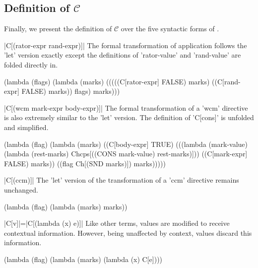 \subsection{Definition of $\mathcal{C}$}

Finally, we present the definition of $\mathcal{C}$ over the five syntactic forms of \cm.

\begin{schemedefinition}{\scheme|C[(rator-expr rand-expr)]|}
\noindent
The formal transformation of application follows the \scheme'let' version exactly except the definitions of \scheme'rator-value' and \scheme'rand-value' are folded directly in.
\begin{schemeblock}
\begin{schemedisplay}
(lambda (flags)
  (lambda (marks)
    (((((C[rator-expr] FALSE) marks)
       ((C[rand-expr] FALSE) marks))
      flags)
     marks)))
\end{schemedisplay}
\end{schemeblock}
\end{schemedefinition}

\begin{schemedefinition}{\scheme|C[(wcm mark-expr body-expr)]|}
\noindent
The formal transformation of a \scheme'wcm' directive is also extremely similar to the \scheme'let' version. The definition of \scheme'C[cons]' is unfolded and simplified.
\begin{schemeblock}
\begin{schemedisplay}
(lambda (flag)
  (lambda (marks)
    ((C[body-expr] TRUE)
     (((lambda (mark-value) (lambda (rest-marks) Chcps[((CONS mark-value) rest-marks)]))
       ((C[mark-expr] FALSE) marks))
      ((flag Ch[(SND marks)]) marks)))))
\end{schemedisplay}
\end{schemeblock}
\end{schemedefinition}

\begin{schemedefinition}{\scheme|C[(ccm)]|}
\noindent
The \scheme'let' version of the transformation of a \scheme'ccm' directive remains unchanged.
\begin{schemeblock}
\begin{schemedisplay}
(lambda (flag)
  (lambda (marks)
    marks))
\end{schemedisplay}
\end{schemeblock}
\end{schemedefinition}

\begin{schemedefinition}{\scheme|C[v]|=\scheme|C[(lambda (x) e)]|}
\noindent
Like other terms, values are modified to receive contextual information. However, being unaffected by context, values discard this information.
\begin{schemeblock}
\begin{schemedisplay}
(lambda (flag)
  (lambda (marks)
    (lambda (x) C[e])))
\end{schemedisplay}
\end{schemeblock}
\end{schemedefinition}

